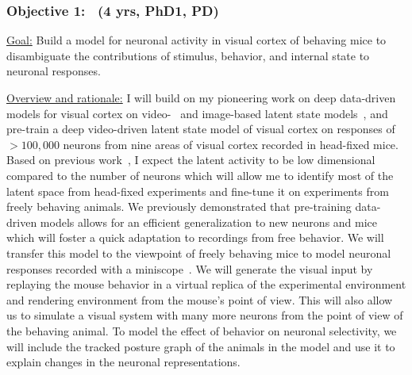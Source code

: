 \documentclass[COG,11pt]{ercgrant}
\begin{document}



\subsubsection{Objective 1: \oonetitle~(4 yrs, PhD1, PD)\hfill{}}
\underline{Goal:} Build a model for neuronal activity in visual cortex of behaving mice to disambiguate the contributions of stimulus, behavior, and internal state to neuronal responses. 


\underline{Overview and rationale:}
I will build on my pioneering work on deep data-driven models for visual cortex on video-~\parencite{Sinz2018-sk} and image-based latent state models~\parencite{Bashiri2021-or}, and pre-train a deep video-driven latent state model of visual cortex on responses of $>100,000$ neurons from nine areas of visual cortex recorded in head-fixed mice.
Based on previous work~\parencite{Stringer2019-lt}, I expect the latent activity to be low dimensional compared to the number of neurons which will allow me to identify most of the latent space from head-fixed experiments and fine-tune it on experiments from freely behaving animals. 
We previously demonstrated that pre-training data-driven models allows for an efficient generalization to new neurons and mice~\parencite{Lurz2020-ua} which will foster a quick adaptation to recordings from free behavior. 
We will transfer this model to the viewpoint of freely behaving mice to model neuronal responses recorded with a miniscope~\parencite{Cadena2017-rb}.
We will generate the visual input by replaying the mouse behavior in a virtual replica of the experimental environment and rendering environment from the mouse's point of view. 
This will also allow us to simulate a visual system with many more neurons from the point of view of the behaving animal.
To model the effect of behavior on neuronal selectivity, we will include the tracked posture graph of the animals in the model and use it to explain changes in the neuronal representations.
\end{document}
